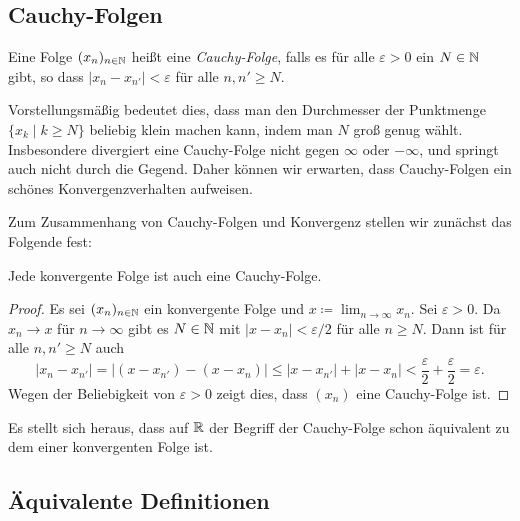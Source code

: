 \documentclass[a4paper,10pt]{article}
\begin{document}
\subsection{Cauchy-Folgen}


\begin{defi}
 Eine Folge $(x_n)_{n \in \mathbb{N}}$ heißt eine \emph{Cauchy-Folge}, falls es für alle $\varepsilon > 0$ ein $N \in \mathbb{N}$ gibt, so dass $|x_n - x_{n'}| < \varepsilon$ für alle $n, n' \geq N$.
\end{defi}


Vorstellungsmäßig bedeutet dies, dass man den Durchmesser der Punktmenge $\{x_k \mid k \geq N\}$ beliebig klein machen kann, indem man $N$ groß genug wählt. Insbesondere divergiert eine Cauchy-Folge nicht gegen $\infty$ oder $-\infty$, und springt auch nicht durch die Gegend. Daher können wir erwarten, dass Cauchy-Folgen ein schönes Konvergenzverhalten aufweisen.


Zum Zusammenhang von Cauchy-Folgen und Konvergenz stellen wir zunächst das Folgende fest:


\begin{lem}
 Jede konvergente Folge ist auch eine Cauchy-Folge.
\end{lem}
\begin{proof}
 Es sei $(x_n)_{n \in \mathbb{N}}$ ein konvergente Folge und $x \coloneqq \lim_{n \to \infty} x_n$. Sei $\varepsilon > 0$. Da $x_n \to x$ für $n \to \infty$ gibt es $N \in \mathbb{N}$ mit $|x - x_n| < \varepsilon/2$ für alle $n \geq N$. Dann ist für alle $n, n' \geq N$ auch
 \[
  |x_n - x_{n'}|
  = |(x - x_{n'}) - (x - x_n)|
  \leq |x - x_{n'}| + |x - x_n|
  < \frac{\varepsilon}{2} + \frac{\varepsilon}{2}
  = \varepsilon.
 \]
 Wegen der Beliebigkeit von $\varepsilon > 0$ zeigt dies, dass $(x_n)$ eine Cauchy-Folge ist.
\end{proof}


Es stellt sich heraus, dass auf $\mathbb{R}$ der Begriff der Cauchy-Folge schon äquivalent zu dem einer konvergenten Folge ist.



\subsection{Äquivalente Definitionen}
\end{document}
